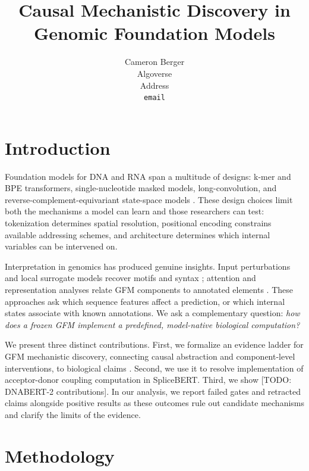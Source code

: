 \documentclass{article}
\title{Causal Mechanistic Discovery in Genomic Foundation Models}
\author{%
  Cameron Berger\\
  Algoverse\\
  Address\\
  \texttt{email}
}
\begin{document}
\maketitle

\begin{abstract}

\end{abstract}
\setcounter{section}{1}
\section{Introduction}

Foundation models for DNA and RNA span a multitude of designs: k-mer and BPE transformers, single-nucleotide masked models, long-convolution, and reverse-complement-equivariant state-space models \citep{ji2021dnabert,chen2024splicebert,zhou2024dnabert2,dallatorre2025nt,nguyen2023hyenadna,schiff2024caduceus}. These design choices limit both the mechanisms a model can learn and those researchers can test: tokenization determines spatial resolution, positional encoding constrains available addressing schemes, and architecture determines which internal variables can be intervened on.

Interpretation in genomics has produced genuine insights.  Input perturbations and local surrogate models recover motifs and syntax \citep{avsec2021bpnet,seitz2024squid}; attention and representation analyses relate GFM components to annotated elements \citep{ji2021dnabert,chen2024splicebert,dallatorre2025nt,consens2025genomicattention}.  These approaches ask which sequence features affect a prediction, or which internal states associate with known annotations.  We ask a complementary question: \emph{how does a frozen GFM implement a predefined, model-native biological computation?}

We present three distinct contributions. First, we formalize an evidence ladder for GFM mechanistic discovery, connecting causal abstraction and component-level interventions, to biological claims \citep{elhage2021framework,geiger2025causal,zhang2024patching}. Second, we use it to resolve implementation of acceptor-donor coupling computation in SpliceBERT. Third, we show [TODO: DNABERT-2 contributions]. In our analysis, we report failed gates and retracted claims alongside positive results as these outcomes rule out candidate mechanisms and clarify the limits of the evidence.

\section{Methodology}
\label{sec:methods}
\end{document}
